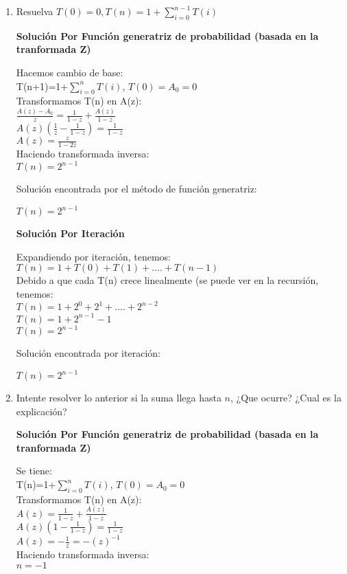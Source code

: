\documentclass{article}
\begin{document}
\begin{enumerate}[label=\textbf{\alph*.}]
  \item Resuelva $T(0)=0, T(n)=1+\sum^{n-1}_{i=0} T(i)$
  
  \textbf{Soluci\'on Por Funci\'on generatriz de probabilidad (basada en la tranformada Z)}
  
  Hacemos cambio de base:\\
  T(n+1)=1+$\sum_{i=0}^{n} T(i)$, $T(0) = A_0 = 0$\\
  Transformamos T(n) en A(z):\\
  $\frac{A(z) - A_0}{z} = \frac{1}{1-z} + \frac{A(z)}{1-z}$\\
  $A(z)(\frac{1}{z}-\frac{1}{1-z})=\frac{1}{1-z}$\\
  $A(z) = \frac{z}{1-2z}$\\
  Haciendo transformada inversa:\\
  $T(n) = 2^{n-1}$

  Soluci\'on encontrada por el m\'etodo de función generatriz:
  \begin{center}
    $T(n) = 2^{n-1}$
  \end{center}
  
  \textbf{Soluci\'on Por Iteración}
    
    Expandiendo por iteración, tenemos:\\
    $T(n) = 1 + T(0) + T(1) + .... + T(n-1)$\\
    Debido a que cada T(n) crece linealmente (se puede ver en la recursión, tenemos:\\
    $T(n) = 1  + 2^0 + 2^1 + .... + 2^{n-2}$\\
    $T(n) = 1  + 2^{n-1} - 1$\\
    $T(n) = 2^{n-1}$

  Soluci\'on encontrada por iteración:
  \begin{center}
    $T(n) = 2^{n-1}$
  \end{center}

  \item Intente resolver lo anterior si la suma llega hasta $n$, ¿Que ocurre? ¿Cual es la explicación?
  
  \textbf{Soluci\'on Por Funci\'on generatriz de probabilidad (basada en la tranformada Z)}
  
  Se tiene:\\
  T(n)=1+$\sum_{i=0}^{n} T(i)$, $T(0) = A_0 = 0$\\
  Transformamos T(n) en A(z):\\
  $A(z) = \frac{1}{1-z} + \frac{A(z)}{1-z}$\\
  $A(z)(1-\frac{1}{1-z})=\frac{1}{1-z}$\\
  $A(z) = -\frac{1}{z} = -(z)^{-1}$\\
  Haciendo transformada inversa:\\
  $n=-1$


\end{enumerate}
\end{document}
